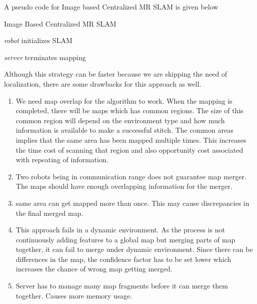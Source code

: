 \documentclass[MTech]{iitmdiss}
\begin{document}
A pseudo code for Image based Centralized MR SLAM is given below
\begin{algorithm}
 \caption{Image Based Centralized MR SLAM}\label{algorithm1}
 
 \textit{robot} initializes SLAM\;
 
 \textit{server} terminates mapping\;
 
\end{algorithm}

Although this strategy can be faster because we are skipping the need of localization, there are some drawbacks for this approach as well.
\begin{enumerate}
    \item We need map overlap for the algorithm to work. When the mapping is completed, there will be maps which has common regions. The size of this common region will depend on the environment type and how much information is available to make a successful stitch. The common areas implies that the same area has been mapped multiple times. This increases the time cost of scanning that region and also opportunity cost associated with repeating of information.
    \item Two robots being in communication range does not guarantee map merger. The maps should have enough overlapping information for the merger. 
    \item same area can get mapped more than once. This may cause discrepancies in the final merged map.
    \item This approach fails in a dynamic environment. As the process is not continuously adding features to a global map but merging parts of map together, it can fail to merge under dynamic environment. Since there can be differences in the map, the confidence factor has to be set lower which increases the chance of wrong map getting merged.
    \item Server has to manage many map fragments before it can merge them together. Causes more memory usage.
\end{enumerate}
\end{document}
